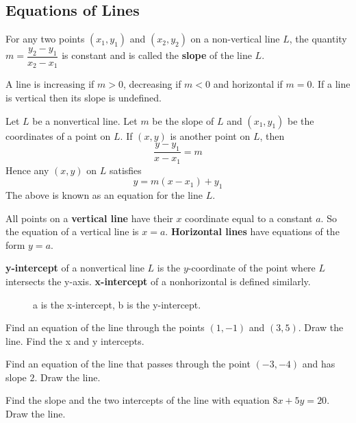 \documentclass[../calc1-main.tex]{subfiles}
\begin{document}
  \subsection*{Equations of Lines}
  For any two points $(x_1, y_1)$ and $(x_2, y_2)$ on a non-vertical line $L$, the quantity $m=\dfrac{y_2-y_1}{x_2-x_1}$ is constant and is called the \textbf{slope} of the line $L$.

  A line is increasing if $m>0$, decreasing if $m<0$ and horizontal if $m=0$. If a line is vertical then its slope is undefined.

  Let $L$ be a nonvertical line. Let $m$ be the slope of $L$ and $(x_1, y_1)$ be the coordinates of a point on $L$. If $(x,y)$ is another point on $L$, then
  \[
    \frac{y-y_1}{x-x_1} = m
  \]
  Hence any $(x,y)$ on $L$ satisfies
  \[
    y = m(x-x_1) + y_1
  \]
  The above is known as an equation for the line $L$.

  All points on a \textbf{vertical line} have their $x$ coordinate equal to a constant $a$. So the equation of a vertical line is $x=a$. \textbf{Horizontal lines} have equations of the form $y=a$.

  \begin{minipage}{0.5\textwidth}
    \textbf{y-intercept} of a nonvertical line $L$ is the $y$-coordinate of the point where $L$ intersects the y-axis. \textbf{x-intercept} of a nonhorizontal is defined similarly.
  \end{minipage}%
  \begin{minipage}{0.5\textwidth}
    \begin{figure}[H]
      \centering
      
      \caption{a is the x-intercept, b is the y-intercept.}
    \end{figure}
  \end{minipage}

  \begin{example}
    Find an equation of the line through the points $(1,-1)$ and $(3,5)$. Draw the line. Find the x and y intercepts.
  \end{example}

  \begin{example}
    Find an equation of the line that passes through the point $(-3,-4) $ and has slope $2$. Draw the line.
  \end{example}

  \begin{example}
    Find the slope and the two intercepts of the line with equation $8x+5y=20$. Draw the line.
  \end{example}
\end{document}

